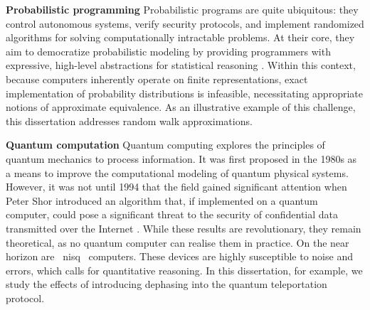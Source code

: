 \textbf{Probabilistic programming}
Probabilistic programs are quite ubiquitous: they control autonomous systems, verify security protocols, and implement randomized algorithms for solving computationally intractable problems. At their core, they aim to democratize probabilistic modeling by providing programmers with expressive, high-level abstractions for statistical reasoning \cite{bartheFoundationsProbabilisticProgramming2020}. 
Within this context, because computers inherently operate on finite representations, exact implementation of probability distributions is infeasible, necessitating appropriate notions of approximate equivalence. As an illustrative example of this challenge, this dissertation addresses random walk approximations.





\textbf{Quantum computation}
Quantum computing explores the principles of quantum mechanics to process information. It was first proposed in the 1980s as a means to improve the computational modeling of quantum physical systems. However, it was not until 1994 that the field gained significant attention when Peter Shor introduced an algorithm that, if implemented on a quantum computer, could pose a significant threat to the security of confidential data transmitted over the Internet \cite{shor1994algorithms}.
While these results are revolutionary, they remain theoretical, as no quantum computer can realise them in practice.
 On the near horizon are  \acrfull{nisq}  computers. These devices are highly susceptible to noise and errors, which calls for quantitative reasoning.  In this dissertation, for example, we study the effects of introducing dephasing into the quantum teleportation protocol.


